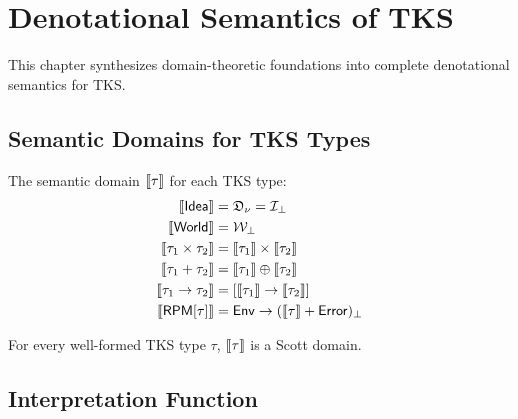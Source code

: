 
\chapter{Denotational Semantics of TKS}
\label{ch:denotational-semantics}

\begin{tcolorbox}[colback=blue!5!white,colframe=blue!75!black,title=\vnewfour]
This chapter synthesizes domain-theoretic foundations into complete
denotational semantics for TKS.
\end{tcolorbox}

\section{Semantic Domains for TKS Types}

\begin{definition}
\label{def:type-interpretation}
The semantic domain $\llbracket \tau \rrbracket$ for each TKS type:
\begin{align*}
\llbracket \mathsf{Idea} \rrbracket &= \mathfrak{D}_\nu = \mathcal{I}_\bot \\
\llbracket \mathsf{World} \rrbracket &= \mathcal{W}_\bot \\
\llbracket \tau_1 \times \tau_2 \rrbracket &= \llbracket \tau_1 \rrbracket \times \llbracket \tau_2 \rrbracket \\
\llbracket \tau_1 + \tau_2 \rrbracket &= \llbracket \tau_1 \rrbracket \oplus \llbracket \tau_2 \rrbracket \\
\llbracket \tau_1 \to \tau_2 \rrbracket &= [\llbracket \tau_1 \rrbracket \to \llbracket \tau_2 \rrbracket] \\
\llbracket \mathsf{RPM}[\tau] \rrbracket &= \mathsf{Env} \to (\llbracket \tau \rrbracket + \mathsf{Error})_\bot
\end{align*}
\end{definition}

\begin{proposition}
\label{prop:type-domains-scott}
For every well-formed TKS type $\tau$, $\llbracket \tau \rrbracket$ is a Scott domain.
\end{proposition}

\section{Interpretation Function}

